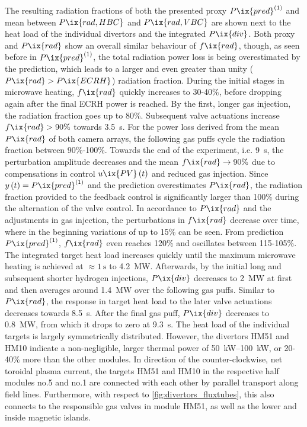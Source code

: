             The resulting radiation fractions of both the presented proxy $P\ix{pred}^{\left(1\right)}$ and mean between $P\ix{rad,HBC}$ and $P\ix{rad,VBC}$ are shown next to the heat load of the individual divertors and the integrated $P\ix{div}$. Both proxy and $P\ix{rad}$ show an overall similar behaviour of $f\ix{rad}$, though, as seen before in $P\ix{pred}^{\left(1\right)}$, the total radiation power loss is being overestimated by the prediction, which leads to a larger and even greater than unity ($P\ix{rad}>P\ix{ECRH}$) radiation fraction. During the initial stages in microwave heating, $f\ix{rad}$ quickly increases to 30-40\%, before dropping again after the final ECRH power is reached. By the first, longer gas injection, the radiation fraction goes up to 80\%. Subsequent valve actuations increase $f\ix{rad}>90\%$ towards \SI{3.5}{\second}. For the power loss derived from the mean $P\ix{rad}$ of both camera arrays, the following gas puffs cycle the radiation fraction between 90\%-100\%. Towards the end of the experiment, i.e. \SI{9}{\second}, the perturbation amplitude decreases and the mean $f\ix{rad}\rightarrow90\%$ due to compensations in control $u\ix{PV}\left(t\right)$ and reduced gas injection. Since $y\left(t\right)=P\ix{pred}^{\left(1\right)}$ and the prediction overestimates $P\ix{rad}$, the radiation fraction provided to the feedback control is significantly larger than 100\% during the alternation of the valve control. In accordance to $P\ix{rad}$ and the adjustments in gas injection, the perturbations in $f\ix{rad}$ decrease over time, where in the beginning variations of up to 15\% can be seen. From prediction $P\ix{pred}^{\left(1\right)}$, $f\ix{rad}$ even reaches 120\% and oscillates between 115-105\%. The integrated target heat load increases quickly until the maximum microwave heating is achieved at $\approx\SI{1}{\second}$ to \SI{4.2}{\mega\watt}. Afterwards, by the initial long and subsequent shorter hydrogen injections, $P\ix{div}$ decreases to \SI{2}{\mega\watt} at first and then averages around \SI{1.4}{\mega\watt} over the following gas puffs. Similar to $P\ix{rad}$, the response in target heat load to the later valve actuations decreases towards \SI{8.5}{\second}. After the final gas puff, $P\ix{div}$ decreases to \SI{0.8}{\mega\watt}, from which it drops to zero at \SI{9.3}{\second}. The heat load of the individual targets is largely symmetrically distributed. However, the divertors HM51 and HM10 indicate a non-negligible, larger thermal power of \SIrange{50}{100}{\kilo\watt}, or 20-40\% more than the other modules. In direction of the counter-clockwise, net toroidal plasma current, the targets HM51 and HM10 in the respective half modules no.5 and no.1 are connected with each other by parallel transport along field lines. Furthermore, with respect to \cref{fig:divertors_fluxtubes}, this also connects to the responsible gas valves in module HM51, as well as the lower and inside magnetic islands.\\%
